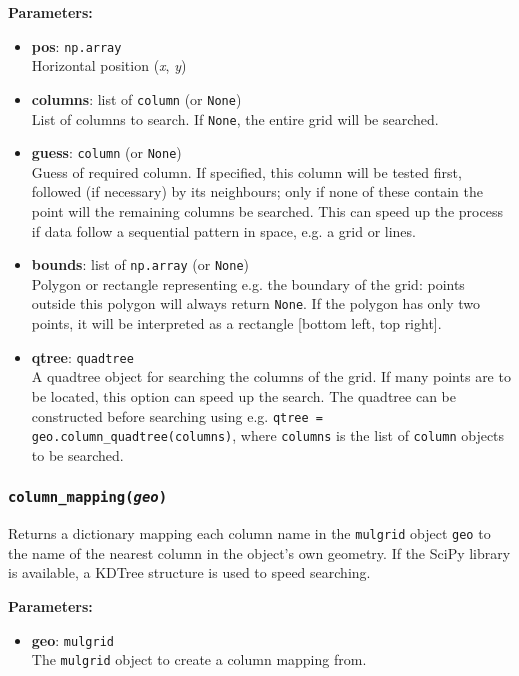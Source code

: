 \textbf{Parameters:}
\begin{itemize}
\item \textbf{pos}: \texttt{np.array}\\
  Horizontal position (\emph{x}, \emph{y})
\item \textbf{columns}: list of \texttt{column} (or \texttt{None})\\
  List of columns to search.  If \texttt{None}, the entire grid will be searched.
\item \textbf{guess}: \texttt{column} (or \texttt{None})\\
  Guess of required column.  If specified, this column will be tested first, followed (if necessary) by its neighbours; only if none of these contain the point will the remaining columns be searched.  This can speed up the process if data follow a sequential pattern in space, e.g. a grid or lines.
 \item \textbf{bounds}: list of \texttt{np.array} (or \texttt{None})\\
  Polygon or rectangle representing e.g. the boundary of the grid: points outside this polygon will always return \texttt{None}.  If the polygon has only two points, it will be interpreted as a rectangle [bottom left, top right].
 \item \textbf{qtree}: \texttt{quadtree} \\
   A quadtree object for searching the columns of the grid.  If many points are to be located, this option can speed up the search.  The quadtree can be constructed before searching using e.g. \texttt{qtree = geo.column\_quadtree(columns)}, where \texttt{columns} is the list of \texttt{column} objects to be searched.
\end{itemize}

\subsubsection{\texttt{column\_mapping(\emph{geo})}}
\label{sec:column_mapping}

Returns a dictionary mapping each column name in the \texttt{mulgrid} object \texttt{geo} to the name of the nearest column in the object's own geometry.  If the SciPy library is available, a KDTree structure is used to speed searching.

\textbf{Parameters:}
\begin{itemize}
\item \textbf{geo}: \texttt{mulgrid}\\
  The \texttt{mulgrid} object to create a column mapping from.
\end{itemize}

